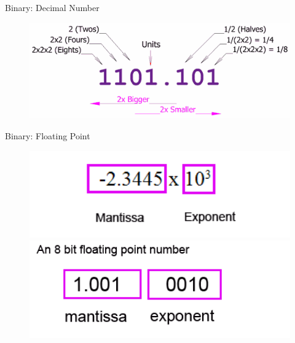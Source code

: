 \documentclass[xcolor={dvipsnames}]{beamer}
\begin{document}
\begin{frame}{Binary: Decimal Number}
	\begin{figure}
		\href{http://www.mathsisfun.com/binary-number-system.html}{\includegraphics[width=1\textwidth]{binary_number}}
	\end{figure}
\end{frame}

\begin{frame}{Binary: Floating Point}
	\begin{figure}
	\href{http://www.teach-ict.com/as_as_computing/ocr/H447/F453/3_3_4/floating_point/miniweb/pg6.htm}{\includegraphics[width=1\textwidth]{floatingpoint}}\\			\href{http://www.teach-ict.com/as_as_computing/ocr/H447/F453/3_3_4/floating_point/miniweb/pg6.htm}{\includegraphics[width=1\textwidth]{mantissa}}
	\end{figure}
\end{frame}
\end{document}
